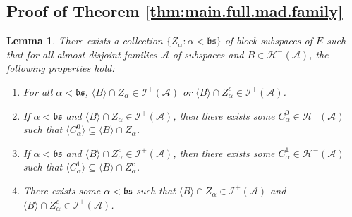 \documentclass[11pt,reqno]{amsart}
\theoremstyle{plain}
\numberwithin{equation}{section}
\newtheorem{lemma}[theorem]{Lemma}
\theoremstyle{definition}
\renewcommand{\c}[1]{\langle #1 \rangle}
\newcommand{\cal}{\mathcal}
\renewcommand{\frak}{\mathfrak}
\newcommand{\A}{\cal{A}}
\renewcommand{\H}{\cal{H}}
\newcommand{\I}{\cal{I}}
\begin{document}
\subsection{Proof of Theorem \ref{thm:main.full.mad.family}}
\begin{lemma}
\label{lem:splitting.lemma}
    There exists a collection $\{Z_\alpha : \alpha < \frak{bs}\}$ of block subspaces of $E$ such that for all almost disjoint families $\A$ of subspaces and $B \in \H^-(\A)$, the following properties hold:
    \begin{enumerate}[label=(\roman*)]
        \item For all $\alpha < \frak{bs}$, $\c{B} \cap Z_\alpha \in \I^+(\A)$ or $\c{B} \cap Z_\alpha^c \in \I^+(\A)$.
    
        \item If $\alpha < \frak{bs}$ and $\c{B} \cap Z_\alpha \in \I^+(\A)$, then there exists some $C_\alpha^0 \in \H^-(\A)$ such that $\c{C_\alpha^0} \subseteq \c{B} \cap Z_\alpha$.

        \item If $\alpha < \frak{bs}$ and $\c{B} \cap Z_\alpha^c \in \I^+(\A)$, then there exists some $C_\alpha^1 \in \H^-(\A)$ such that $\c{C_\alpha^1} \subseteq \c{B} \cap Z_\alpha^c$.

        \item There exists some $\alpha < \frak{bs}$ such that $\c{B} \cap Z_\alpha \in \I^+(\A)$ and $\c{B} \cap Z_\alpha^c \in \I^+(\A)$.
    \end{enumerate}
\end{lemma}
\end{document}
